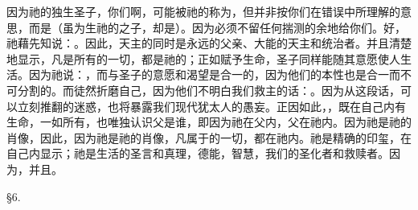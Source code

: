 因为祂的独生圣子，你们啊，可能被祂的称为，但并非按你们在错误中所理解的意思，而是（虽为生祂的之子，却是）。因为必须不留任何揣测的余地给你们。好，祂藉先知说：。因此，天主的同时是永远的父亲、大能的天主和统治者。并且清楚地显示，凡是所有的一切，都是祂的；正如赋予生命，圣子同样能随其意愿使人生活。因为祂说：，而与圣子的意愿和渴望是合一的，因为他们的本性也是合一而不可分割的。而徒然折磨自己，因为他们不明白我们救主的话：。因为从这段话，可以立刻推翻的迷惑，也将暴露我们现代犹太人的愚妄。正因如此，，既在自己内有生命，一如所有，也唯独认识父是谁，即因为祂在父内，父在祂内。因为祂是祂的肖像，因此，因为祂是祂的肖像，凡属于的一切，都在祂内。祂是精确的印玺，在自己内显示；祂是生活的圣言和真理，德能，智慧，我们的圣化者和救赎者。因为，并且。\par

§6. \par

